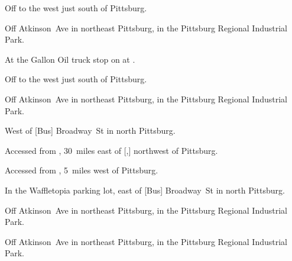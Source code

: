 
\begin{LocationList}

Off  to the west just south of Pittsburg.

Off Atkinson~Ave in northeast Pittsburg, in the Pittsburg Regional Industrial Park.

At the Gallon Oil truck stop on  at  .

Off  to the west just south of Pittsburg.

Off Atkinson~Ave in northeast Pittsburg, in the Pittsburg Regional Industrial Park.

West of [Bus] Broadway~St in north Pittsburg.

Accessed from , 30~miles east of [,] northwest of Pittsburg.

Accessed from , 5~miles west of Pittsburg.

In the Waffletopia parking lot, east of [Bus] Broadway~St in north Pittsburg.

Off Atkinson~Ave in northeast Pittsburg, in the Pittsburg Regional Industrial Park.

\Location{\TruckService \Service}
Off Atkinson~Ave in northeast Pittsburg, in the Pittsburg Regional Industrial Park.

\end{LocationList}
